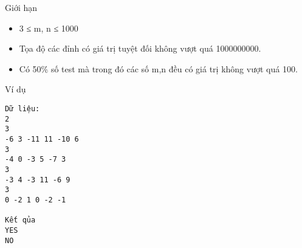 Giới hạn
\begin{itemize}
	\item     3 ≤ m, n ≤ 1000   
	\item     Tọa độ các đỉnh có giá trị tuyệt đối không vượt quá 1000000000.   
	\item     Có 50\% số test mà trong đó các số m,n đều có giá trị không vượt quá 100.   
\end{itemize}
Ví dụ
\begin{verbatim}
Dữ liệu:
2
3
-6 3 -11 11 -10 6 
3
-4 0 -3 5 -7 3 
3
-3 4 -3 11 -6 9 
3
0 -2 1 0 -2 -1 

Kết qủa
YES
NO
\end{verbatim}
